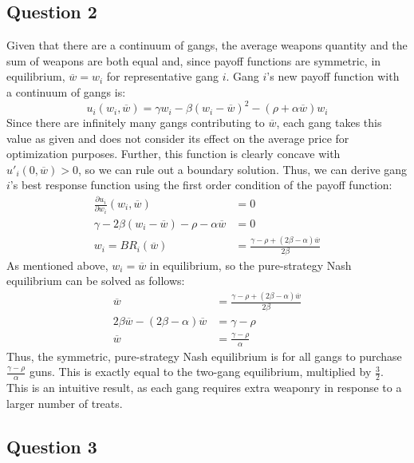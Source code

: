 \documentclass{article}
\newcommand{\olw}{\overline{w}}
\begin{document}
\begin{enumerate}[(a)]
\end{enumerate}



\pagebreak
\subsection*{Question 2}
Given that there are a continuum of gangs, the average weapons quantity and the sum of weapons are both equal and, since payoff functions are symmetric, in equilibrium, $\olw=w_i$ for representative gang $i$. Gang $i$'s new payoff function with a continuum of gangs is:
\[
	u_i(w_i,\olw) = \gamma w_i - \beta(w_i - \olw)^2 - (\rho + \alpha\olw)w_i
\]
Since there are infinitely many gangs contributing to $\olw$, each gang takes this value as given and does not consider its effect on the average price for optimization purposes. Further, this function is clearly concave with ${u'_i(0,\olw)>0}$, so we can rule out a boundary solution. Thus, we can derive gang $i$'s best response function using the first order condition of the payoff function:
\begin{align*}
	\frac{\partial u_i}{\partial w_i}(w_i,\olw) & = 0	\\
	\gamma - 2\beta(w_i - \olw) - \rho - \alpha\olw &= 0	\\
	w_i = BR_i(\olw) &= \frac{\gamma - \rho + (2\beta - \alpha)\olw}{2\beta}
\end{align*}
As mentioned above, $w_i=\olw$ in equilibrium, so the pure-strategy Nash equilibrium can be solved as follows:
\begin{align*}
	\olw &= \frac{\gamma - \rho + (2\beta - \alpha)\olw}{2\beta}	\\
	2\beta\olw -(2\beta-\alpha)\olw &= \gamma - \rho 	\\
	\olw &= \frac{\gamma - \rho}{\alpha}
\end{align*}
Thus, the symmetric, pure-strategy Nash equilibrium is for all gangs to purchase $\frac{\gamma - \rho}{\alpha}$ guns. This is exactly equal to the two-gang equilibrium, multiplied by $\frac{3}{2}$. This is an intuitive result, as each gang requires extra weaponry in response to a larger number of treats.

\pagebreak
\subsection*{Question 3}
\end{document}
